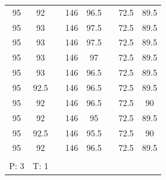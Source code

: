 \documentclass{scrreprt}
\begin{document}
\begin{table}[H]
\begin{tabular}{ccp{1.5cm}ccp{1.5cm}cc}
     95 &         92 &            &      146 &         96.5 &            &         72.5 &         89.5 \\
     95 &         93 &            &      146 &         97.5 &            &         72.5 &         89.5 \\
     95 &         93 &            &      146 &         97.5 &            &         72.5 &         89.5 \\
     95 &         93 &            &      146 &         97 &              &         72.5 &         89.5 \\
     95 &         93 &            &      146 &         96.5 &            &         72.5 &         89.5 \\
     95 &         92.5 &          &      146 &         96.5 &            &         72.5 &         89.5 \\
     95 &         92 &            &      146 &         96.5 &            &         72.5 &         90 \\
     95 &         92 &            &      146 &         95 &              &         72.5 &         89.5 \\
     95 &         92.5 &          &      146 &         95.5 &            &         72.5 &         90 \\
     95 &         92 &            &      146 &         96.5 &            &         72.5 &         89.5 \\
           &         &            &            &            &            &            &            \\

 P: 3 &   T: 1 &            &            &            &            &            &            \\\cline{1-2}


\end{tabular}
\end{table}
\end{document}
